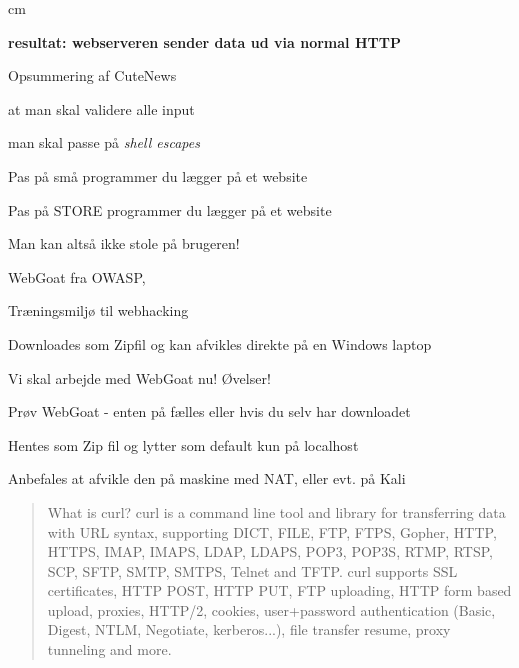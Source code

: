 \documentclass[20pt,landscape,a4paper,footrule]{foils}
\begin{document}
 cm

\centerline{\bfseries resultat: webserveren sender data ud via normal HTTP}




\begin{list1}
\item Opsummering af CuteNews
\begin{list2}
\item at man skal validere alle input
\item man skal passe på \emph{shell escapes}
\item Pas på små programmer du lægger på et website
\item Pas på STORE programmer du lægger på et website
\end{list2}
\item {\color{red}
Man kan altså ikke stole på brugeren!}
\end{list1}



\begin{list1}
\item WebGoat fra OWASP, 
\item Træningsmiljø til webhacking
\item Downloades som Zipfil og kan afvikles direkte på en Windows laptop
\end{list1}


Vi skal arbejde med WebGoat nu! Øvelser!



\begin{list1}
\item Prøv WebGoat - enten på fælles eller hvis du selv har downloadet
\item Hentes som Zip fil og lytter som default kun på localhost
\item Anbefales at afvikle den på maskine med NAT, eller evt. på Kali
\end{list1}




\begin{quote}
	What is curl?
curl is a command line tool and library for transferring data with URL syntax, supporting DICT, FILE, FTP, FTPS, Gopher, HTTP, HTTPS, IMAP, IMAPS, LDAP, LDAPS, POP3, POP3S, RTMP, RTSP, SCP, SFTP, SMTP, SMTPS, Telnet and TFTP. curl supports SSL certificates, HTTP POST, HTTP PUT, FTP uploading, HTTP form based upload, proxies, HTTP/2, cookies, user+password authentication (Basic, Digest, NTLM, Negotiate, kerberos...), file transfer resume, proxy tunneling and more.
\end{quote}
\end{document}
